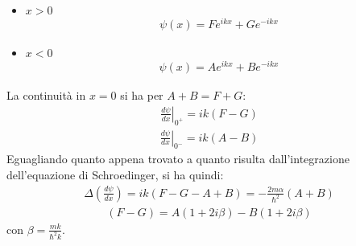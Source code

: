 \begin{itemize}
\item $x>0$
\begin{equation}\begin{split}
\psi \left(x\right)=Fe^{ikx}+Ge^{-ikx}
\end{split}\end{equation}
\item $x<0$
\begin{equation}\begin{split}
\psi \left(x\right)=Ae^{ikx}+Be^{-ikx}
\end{split}\end{equation}
\end{itemize}

La continuità in $x=0$ si ha per $A+B=F+G$:
\begin{equation}\begin{split}
\left.\frac{d\psi }{dx}\right |_{0^+}=ik\left(F-G\right)
\end{split}\end{equation}
\begin{equation}\begin{split}
\left.\frac{d\psi }{dx}\right |_{0^-}=ik\left(A-B\right)
\end{split}\end{equation}
Eguagliando quanto appena trovato a quanto risulta dall'integrazione dell'equazione di Schroedinger, si ha quindi:
\begin{equation}\begin{split}
\Delta \left(\frac{d\psi }{dx}\right)=ik\left(F-G-A+B\right)=-\frac{2m\alpha}{\hbar ^2}\left(A+B\right)
\end{split}\end{equation}
\begin{equation}\begin{split}
\left(F-G\right)=A\left(1+2i\beta\right)-B\left(1+2i\beta\right)
\end{split}\end{equation}
con $\beta =\frac{mk}{\hbar ^2k}$.

